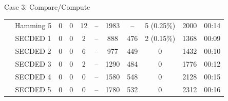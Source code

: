 \begin{frame}[noframenumbering]{Case 3: Compare/Compute}
\begin{table}[H]
\begin{tabular}{@{}ccccccccccc@{}}
                                                               & Hamming 5 & 0     & 0      & 12    & --        & 1983                                     & --                                      & 5 {\tiny (0.25\%)}                            & 2000        & 00:14                           \\
                                                               & SECDED 1       & 0     & 0      & 2     & --        & 888                                      & 476                                     & 2 {\tiny (0.15\%)}                            & 1368        & 00:09                           \\
                                                               & SECDED 2       & 0     & 0      & 6     & --        & 977                                      & 449                                     & 0                                             & 1432        & 00:10                           \\
                                                               & SECDED 3       & 0     & 0      & 2     & --        & 1290                                     & 484                                     & 0                                             & 1776        & 00:12                           \\
                                                               & SECDED 4       & 0     & 0      & 0     & --        & 1580                                     & 548                                     & 0                                             & 2128        & 00:15                           \\
                                                               & SECDED 5       & 0     & 0      & 0     & --        & 1780                                     & 532                                     & 0                                             & 2312        & 00:16                           \\
            \bottomrule
        \end{tabular}
    \end{table}
\end{frame}

